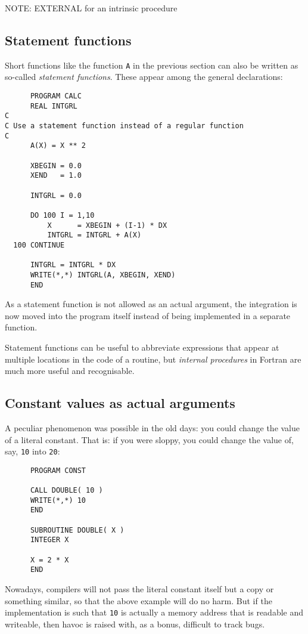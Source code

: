 NOTE: EXTERNAL for an intrinsic procedure


\subsection{Statement functions}
Short functions like the function \verb+A+ in the previous section can also be
written as so-called \emph{statement functions}. These appear among the general
declarations:
\begin{verbatim}
      PROGRAM CALC
      REAL INTGRL
C
C Use a statement function instead of a regular function
C
      A(X) = X ** 2

      XBEGIN = 0.0
      XEND   = 1.0

      INTGRL = 0.0

      DO 100 I = 1,10
          X      = XBEGIN + (I-1) * DX
          INTGRL = INTGRL + A(X)
  100 CONTINUE

      INTGRL = INTGRL * DX
      WRITE(*,*) INTGRL(A, XBEGIN, XEND)
      END
\end{verbatim}

As a statement function is not allowed as an actual argument, the integration
is now moved into the program itself instead of being implemented in a separate
function.

Statement functions can be useful to abbreviate expressions that appear at
multiple locations in the code of a routine, but \emph{internal procedures}
in Fortran are much more useful and recognisable.


\subsection{Constant values as actual arguments}
A peculiar phenomenon was possible in the old days: you could change the
value of a literal constant. That is: if you were sloppy, you could change the
value of, say, \verb+10+ into \verb+20+:
\begin{verbatim}
      PROGRAM CONST

      CALL DOUBLE( 10 )
      WRITE(*,*) 10
      END

      SUBROUTINE DOUBLE( X )
      INTEGER X

      X = 2 * X
      END
\end{verbatim}

Nowadays, compilers will not pass the literal constant itself but a copy or something similar, so that
the above example will do no harm. But if the implementation is such that \verb+10+
is actually a memory address that is readable and writeable, then havoc is raised with, as
a bonus, difficult to track bugs.


